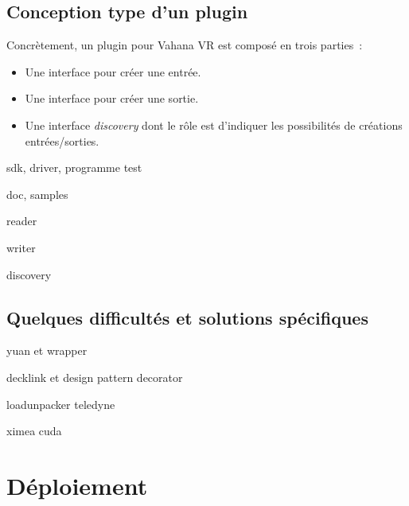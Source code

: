 \subsection{Conception type d'un plugin}
Concrètement, un plugin pour Vahana VR est composé en trois parties~:
\begin{itemize}
  \item Une interface pour créer une entrée.
  \item Une interface pour créer une sortie.
  \item Une interface \textit{discovery} dont le rôle est d'indiquer les possibilités
    de créations entrées/sorties.
\end{itemize}
sdk, driver, programme test

doc, samples

reader

writer

discovery

\subsection{Quelques difficultés et solutions spécifiques}
yuan et wrapper

decklink et design pattern decorator

loadunpacker teledyne

ximea cuda


\section{Déploiement}

